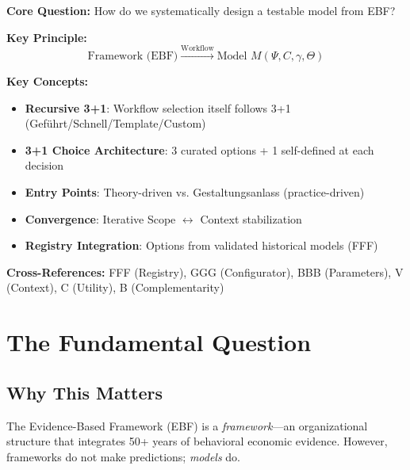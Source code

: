 \begin{tcolorbox}[colback=blue!5!white, colframe=blue!75!black,
    title=Quick Reference: Model Design Workflow]

\textbf{Core Question:} How do we systematically design a testable model from EBF?

\textbf{Key Principle:}
\begin{equation}
\text{Framework (EBF)} \xrightarrow{\text{Workflow}} \text{Model } M(\Psi, C, \gamma, \Theta)
\end{equation}

\textbf{Key Concepts:}
\begin{itemize}[nosep]
\item \textbf{Recursive 3+1}: Workflow selection itself follows 3+1 (Geführt/Schnell/Template/Custom)
\item \textbf{3+1 Choice Architecture}: 3 curated options + 1 self-defined at each decision
\item \textbf{Entry Points}: Theory-driven vs. Gestaltungsanlass (practice-driven)
\item \textbf{Convergence}: Iterative Scope $\leftrightarrow$ Context stabilization
\item \textbf{Registry Integration}: Options from validated historical models (FFF)
\end{itemize}

\textbf{Cross-References:} FFF (Registry), GGG (Configurator), BBB (Parameters), V (Context), C (Utility), B (Complementarity)
\end{tcolorbox}



\section{The Fundamental Question}
\label{sec:eee-fundamental}

\subsection{Why This Matters}

The Evidence-Based Framework (EBF) is a \textit{framework}---an organizational
structure that integrates 50+ years of behavioral economic evidence. However,
frameworks do not make predictions; \textit{models} do.

